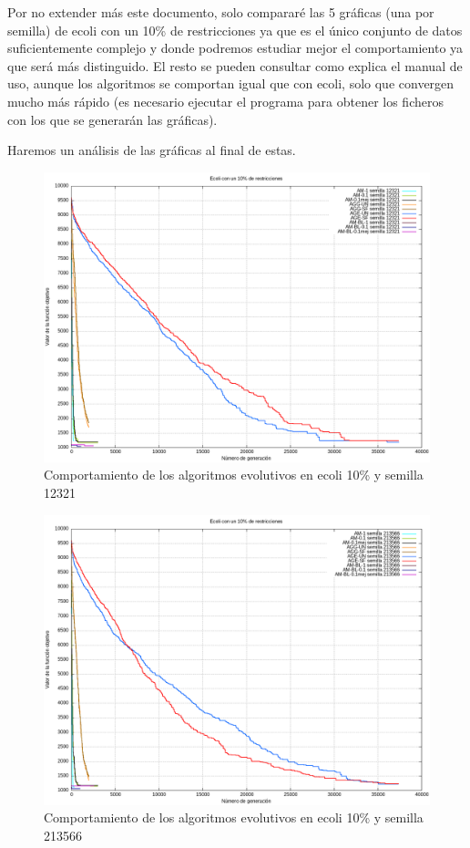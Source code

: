 \documentclass[12pt, spanish]{article}
\begin{document}
Por no extender más este documento, solo compararé las 5 gráficas (una por semilla) de ecoli con un 10\% de restricciones ya que es el único conjunto de datos suficientemente complejo y donde podremos estudiar mejor el comportamiento ya que será más distinguido. El resto se pueden consultar como explica el manual de uso, aunque los algoritmos se comportan igual que con ecoli, solo que convergen mucho más rápido (es necesario ejecutar el programa para obtener los ficheros con los que se generarán las gráficas).

Haremos un análisis de las gráficas al final de estas.

\begin{figure}[H]
  \centering
      \includegraphics[scale = 0.50]{ecoli_set_const_10_12321.png}
 		 \caption{Comportamiento de los algoritmos evolutivos en ecoli 10\% y semilla 12321}
  		\label{fig:g-12321}

\end{figure}


\begin{figure}[H]
  \centering
      \includegraphics[scale = 0.50]{ecoli_set_const_10_213566.png}
 		 \caption{Comportamiento de los algoritmos evolutivos en ecoli 10\% y semilla 213566}
  		\label{fig:g-213566}

\end{figure}
\end{document}
